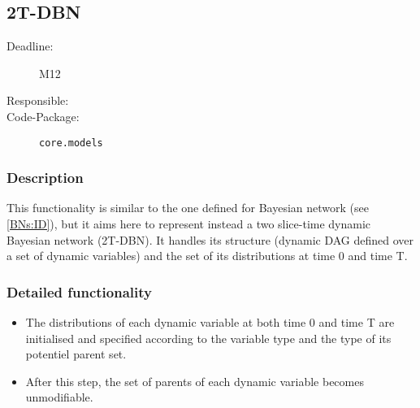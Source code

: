 \subsection{2T-DBN}
\label{2TDBN:ID}

\begin{description}
\item[Deadline:] M12
\item[Responsible:]
\item[Code-Package:] \texttt{core.models}
\end{description}

\subsubsection*{Description}

This functionality is similar to the one defined for Bayesian network (see \ref{BNs:ID}), but it aims here to represent instead a two slice-time dynamic Bayesian network (2T-DBN). It handles its structure (dynamic DAG defined over a set of dynamic variables) and the set of its distributions at time 0 and time T. 

\subsubsection*{Detailed functionality}

\begin{itemize}

\item The distributions of each dynamic variable at both time 0 and time T are initialised and specified according to the variable type and the type of its potentiel parent set. 

\item After this step, the set of parents of each dynamic variable becomes unmodifiable.

\end{itemize}

